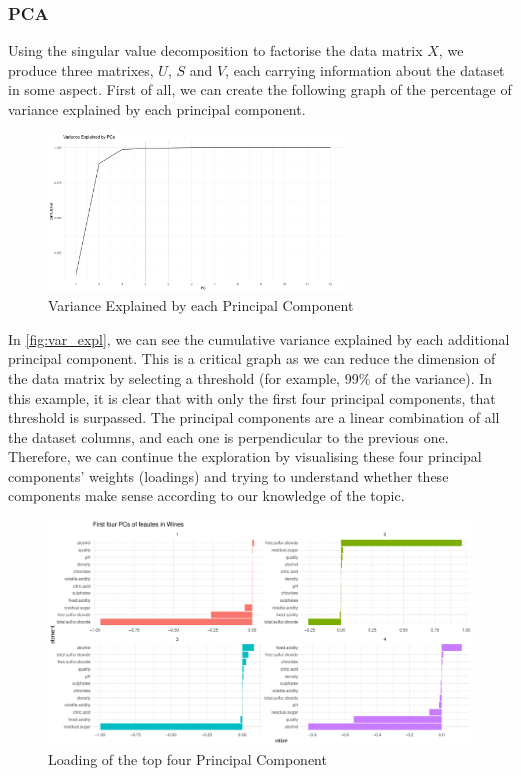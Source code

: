 \documentclass[11pt,twoside]{article}
\numberwithin{Theorem}{section}
\numberwithin{Definition}{section}
\numberwithin{Lemma}{section}
\numberwithin{Algorithm}{section}
\numberwithin{equation}{section}
\begin{document}
\subsubsection{PCA}
\label{sec:pca}
Using the singular value decomposition to factorise the data matrix $X$, we produce three matrixes, $U$, $S$ and $V$, each carrying information about the dataset in some aspect. First of all, we can create the following graph of the percentage of variance explained by each principal component.
\vspace*{1em}
\begin{figure}[!h]
\centering
\includegraphics[width=0.7\textwidth]{./output/1.a.pca-var-expl.pdf}
\caption{Variance Explained by each Principal Component}
\label{fig:var_expl}
\end{figure}
\vspace{2em}
In \autoref{fig:var_expl}, we can see the cumulative variance explained by each additional principal component. This is a critical graph as we can reduce the dimension of the data matrix by selecting a threshold (for example, 99\% of the variance). In this example, it is clear that with only the first four principal components, that threshold is surpassed.
The principal components are a linear combination of all the dataset columns, and each one is perpendicular to the previous one. Therefore, we can continue the exploration by visualising these four principal components' weights (loadings) and trying to understand whether these components make sense according to our knowledge of the topic.
\vspace*{1em}
\begin{figure}[!h]
\centering
\includegraphics[width=\textwidth]{./output/1.b.pca-features.pdf}
\caption{Loading of the top four Principal Component}
\end{figure}
\end{document}
